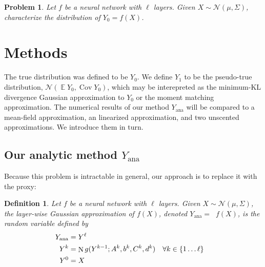 \documentclass{article}
\newtheorem{definition}{Definition}
\newtheorem{problem}{Problem}
\DeclareMathOperator{\expect}{\mathbb{E}}
\DeclareMathOperator{\Cov}{\operatorname{Cov}}
\DeclareMathOperator{\normal}{\mathrm N}
\DeclareMathOperator{\Normal}{\mathrm N^*}
\begin{document}
\begin{problem}
    \label{prob:problem}
    Let \(f\) be a neural network with \(\ell\) layers.
    Given \(X \sim \mathcal N(\mu, \Sigma)\), characterize the distribution of \(Y_0 = f(X)\).
\end{problem}


\section{Methods}
The true distribution was defined to be \(Y_0\).
We define \(Y_1\) to be the pseudo-true distribution, \(\mathcal N(\expect Y_0, \Cov Y_0)\), which may be interepreted as the minimum-KL divergence Gaussian approximation to \(Y_0\) or the moment matching approximation.
The numerical results of our method \(Y_\text{ana}\) will be compared to a mean-field approximation, an linearized approximation, and two unscented approximations.
We introduce them in turn.

\subsection{Our analytic method \(Y_\mathrm{ana}\)}
Because this problem is intractable in general, our approach is to replace it with the proxy:

\begin{definition}
    Let \(f\) be a neural network with \(\ell\) layers.
    Given \(X \sim \mathcal N(\mu, \Sigma)\), the layer-wise Gaussian approximation of \(f(X)\), denoted \(Y_\mathrm{ana} = \Normal f(X)\), is the random variable defined by
    \begin{align*}
        Y_\mathrm{ana} &=  Y^\ell\\
        Y^k &= \normal g(Y^{k-1}; A^k, b^k, C^k, d^k) & \forall k &\in \cbr{1 \ldots \ell} \\
        Y^0 &= X
    \end{align*}
\end{definition}
\end{document}
